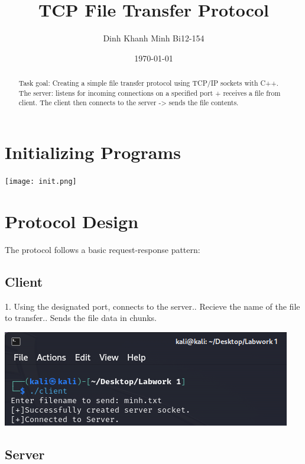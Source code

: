 \documentclass{article}
\begin{document}
\title{TCP File Transfer Protocol}
\author{Dinh Khanh Minh Bi12-154}
\date{\today}

\maketitle

\begin{abstract}
Task goal: Creating a simple file transfer protocol using TCP/IP sockets with C++. \newline 
The server: listens for incoming connections on a specified port + receives a file from client. \newline
The client then connects to the server -> sends the file contents.
\end{abstract}

\section{Initializing Programs}

\texttt{[image: init.png]}

\section{Protocol Design}

The protocol follows a basic request-response pattern:

\subsection{Client}

1. Using the designated port, connects to the server.. Recieve the name of the file to transfer.. Sends the file data in chunks.\newline 

\includegraphics[width=1\linewidth]{client.png}
\subsection{Server}
\end{document}
